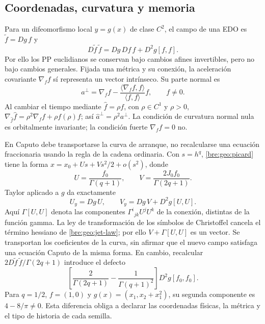 \subsection{Coordenadas, curvatura y memoria}

Para un difeomorfismo local $y=g(x)$ de clase $C^2$, el campo de una EDO es
$\widetilde f=Dg\,f$ y
\begin{equation}
 D\widetilde f\,\widetilde f
 =Dg\,Df\,f+D^2g[f,f].
 \label{bre:geo:coordinate-law}
\end{equation}
Por ello los PP euclidianos se conservan bajo cambios afines invertibles,
pero no bajo cambios generales. Fijada una métrica y su conexión, la
aceleración covariante $\nabla_f f$ sí representa un vector intrínseco.
Su parte normal es
\begin{equation}
 a^\perp=\nabla_f f-
 \frac{\langle\nabla_f f,f\rangle}{\langle f,f\rangle}f,
 \qquad f\ne0.
 \label{bre:geo:normal}
\end{equation}
Al cambiar el tiempo mediante $\widehat f=\rho f$, con $\rho\in C^1$ y $\rho>0$,
$\nabla_{\widehat f}\widehat f=\rho^2\nabla_f f+\rho f(\rho)f$;
así $\widehat a^\perp=\rho^2a^\perp$. La condición de curvatura normal
nula es orbitalmente invariante; la condición fuerte $\nabla_f f=0$ no.

En Caputo debe transportarse la curva de arranque, no recalcularse una
ecuación fraccionaria usando la regla de la cadena ordinaria. Con
$s=h^q$, \eqref{bre:geo:picard} tiene la forma
$x=x_0+Us+Vs^2/2+o(s^2)$, donde
\begin{equation}
 U=\frac{f_0}{\Gamma(q+1)},\qquad
 V=\frac{2J_0f_0}{\Gamma(2q+1)}.
 \label{bre:geo:jet}
\end{equation}
Taylor aplicado a $g$ da exactamente
\begin{equation}
 U_y=Dg\,U,\qquad V_y=Dg\,V+D^2g[U,U].
 \label{bre:geo:jet-law}
\end{equation}
Aquí $\Gamma[U,U]$ denota las componentes
$\Gamma^i{}_{jk}U^jU^k$ de la conexión, distintas de la función gamma.
La ley de transformación de los símbolos de Christoffel cancela el
término hessiano de \eqref{bre:geo:jet-law}; por ello
$V+\Gamma[U,U]$ es un vector. Se transportan los coeficientes de la
curva, sin afirmar que el nuevo campo satisfaga una ecuación Caputo de
la misma forma. En cambio, recalcular
$2D\widetilde f\,\widetilde f/\Gamma(2q+1)$ introduce el defecto
\begin{equation}
 \left[\frac2{\Gamma(2q+1)}-\frac1{\Gamma(q+1)^2}\right]D^2g[f_0,f_0].
 \label{bre:geo:jet-defect}
\end{equation}
Para $q=1/2$, $f=(1,0)$ y $g(x)=(x_1,x_2+x_1^2)$, su segunda
componente es $4-8/\pi\ne0$. Esta diferencia obliga a declarar las
coordenadas físicas, la métrica y el tipo de historia de cada semilla.


